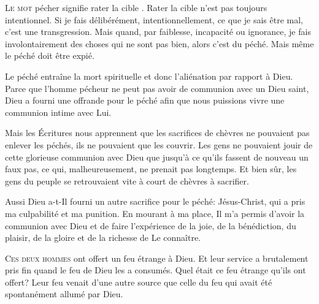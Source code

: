 \lettrine{L}{e mot} \Og pécher \Fg{} signifie \Og rater la cible \Fg{}.
 Rater la cible n'est pas toujours intentionnel.
 Si je fais délibérément, intentionnellement, ce que je sais être mal,
 c'est une transgression. Mais quand, par faiblesse, incapacité ou ignorance,
 je fais involontairement des choses qui ne sont pas bien, 
 alors c'est du péché. Mais même le péché doit être expié.


Le péché entraîne la mort spirituelle et donc l'aliénation par rapport à Dieu.
 Parce que l'homme pécheur ne peut pas avoir de communion avec un Dieu saint,
 Dieu a fourni une offrande pour le péché afin que nous puissions vivre
 une communion intime avec Lui.

Mais les Écritures nous apprennent que les sacrifices de chèvres
 ne pouvaient pas enlever les péchés, ils ne pouvaient que les couvrir.
 Les gens ne pouvaient jouir de cette glorieuse communion avec Dieu
 que jusqu'à ce qu'ils fassent de nouveau un faux pas, ce qui, malheureusement,
 ne prenait pas longtemps.
 Et bien sûr, les gens du peuple se retrouvaient vite
 à court de chèvres à sacrifier.

Aussi Dieu a-t-Il fourni un autre sacrifice pour le péché: Jésus-Christ,
 qui a pris ma culpabilité et ma punition.
 En mourant à ma place, Il m'a permis d'avoir la communion avec Dieu
 et de faire l'expérience de la joie, de la bénédiction, du plaisir,
 de la gloire et de la richesse de Le connaître. 

\dvrule







\lettrine{C}{es deux hommes} ont offert un feu étrange à Dieu.
 Et leur service a brutalement pris fin quand le feu de Dieu les a consumés.
 Quel était ce feu étrange qu'ils ont offert?
 Leur feu venait d'une autre source que celle du feu
 qui avait été spontanément allumé par Dieu.

